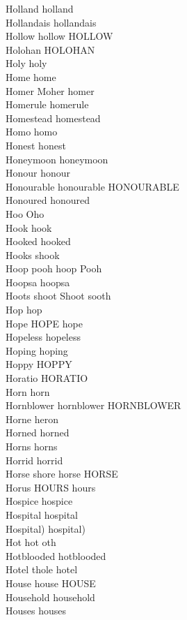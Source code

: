 Holland holland\\
Hollandais hollandais\\
Hollow hollow HOLLOW\\
Holohan HOLOHAN\\
Holy holy\\
Home home\\
Homer Moher homer\\
Homerule homerule\\
Homestead homestead\\
Homo homo\\
Honest honest\\
Honeymoon honeymoon\\
Honour honour\\
Honourable honourable HONOURABLE\\
Honoured honoured\\
Hoo Oho\\
Hook hook\\
Hooked hooked\\
Hooks shook\\
Hoop pooh hoop Pooh\\
Hoopsa hoopsa\\
Hoots shoot Shoot sooth\\
Hop hop\\
Hope HOPE hope\\
Hopeless hopeless\\
Hoping hoping\\
Hoppy HOPPY\\
Horatio HORATIO\\
Horn horn\\
Hornblower hornblower HORNBLOWER\\
Horne heron\\
Horned horned\\
Horns horns\\
Horrid horrid\\
Horse shore horse HORSE\\
Horus HOURS hours\\
Hospice hospice\\
Hospital hospital\\
Hospital) hospital)\\
Hot hot oth\\
Hotblooded hotblooded\\
Hotel thole hotel\\
House house HOUSE\\
Household household\\
Houses houses\\
